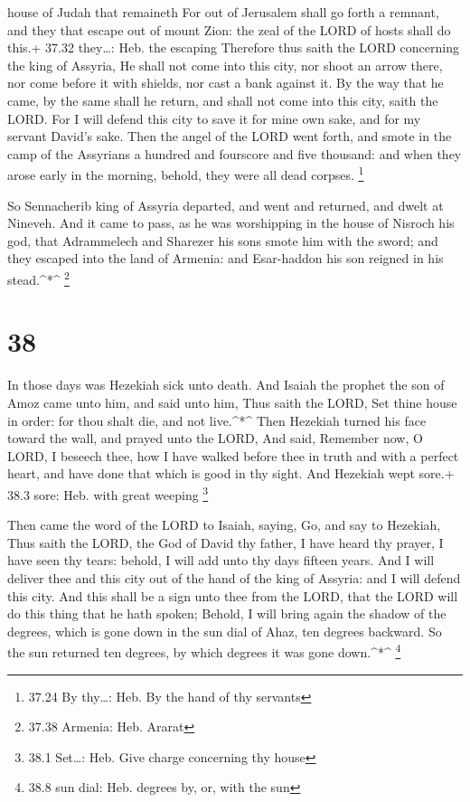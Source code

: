house of Judah that remaineth  For out of Jerusalem shall
go forth a remnant, and they that escape out of mount Zion: the zeal of
the LORD of hosts shall do this.+ 37.32 they\ldots: Heb. the escaping
 Therefore thus saith the LORD concerning the king of
Assyria, He shall not come into this city, nor shoot an arrow there, nor
come before it with shields, nor cast a bank against it. 
By the way that he came, by the same shall he return, and shall not come
into this city, saith the LORD.  For I will defend this
city to save it for mine own sake, and for my servant David's sake.
 Then the angel of the LORD went forth, and smote in the
camp of the Assyrians a hundred and fourscore and five thousand: and
when they arose early in the morning, behold, they were all dead
corpses. \footnote{37.24 By thy\ldots: Heb. By the hand of thy servants}

 So Sennacherib king of Assyria departed, and went and
returned, and dwelt at Nineveh.  And it came to pass, as he
was worshipping in the house of Nisroch his god, that Adrammelech and
Sharezer his sons smote him with the sword; and they escaped into the
land of Armenia: and Esar-haddon his son reigned in his stead.\^{}*\^{}
\footnote{37.38 Armenia: Heb. Ararat}

\hypertarget{section-37}{%
\section{38}\label{section-37}}

 In those days was Hezekiah sick unto death. And Isaiah the
prophet the son of Amoz came unto him, and said unto him, Thus saith the
LORD, Set thine house in order: for thou shalt die, and not
live.\^{}*\^{}  Then Hezekiah turned his face toward the
wall, and prayed unto the LORD,  And said, Remember now, O
LORD, I beseech thee, how I have walked before thee in truth and with a
perfect heart, and have done that which is good in thy sight. And
Hezekiah wept sore.+ 38.3 sore: Heb. with great weeping \footnote{38.1
  Set\ldots: Heb. Give charge concerning thy house}

 Then came the word of the LORD to Isaiah, saying,
 Go, and say to Hezekiah, Thus saith the LORD, the God of
David thy father, I have heard thy prayer, I have seen thy tears:
behold, I will add unto thy days fifteen years.  And I will
deliver thee and this city out of the hand of the king of Assyria: and I
will defend this city.  And this shall be a sign unto thee
from the LORD, that the LORD will do this thing that he hath spoken;
 Behold, I will bring again the shadow of the degrees, which
is gone down in the sun dial of Ahaz, ten degrees backward. So the sun
returned ten degrees, by which degrees it was gone down.\^{}*\^{}
\footnote{38.8 sun dial: Heb. degrees by, or, with the sun}

